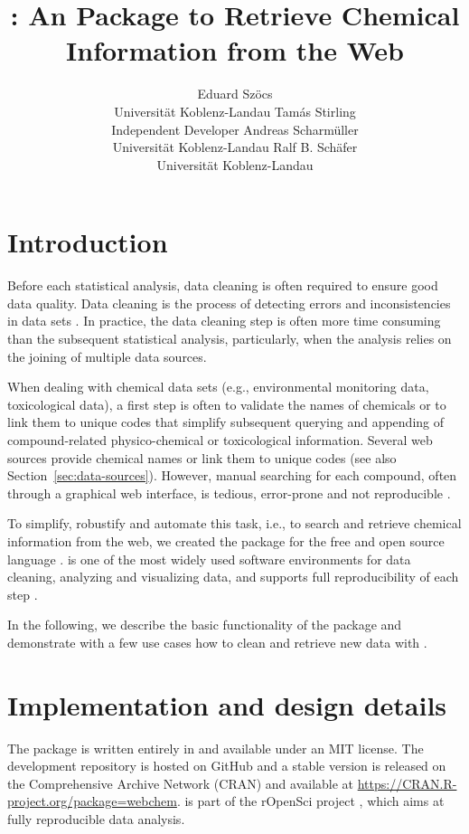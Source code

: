 \documentclass[article]{jss}
\author{Eduard Sz\"ocs\\Universit\"at Koblenz-Landau \And
	      Tam\'as Stirling\\Independent Developer \And
	      Andreas Scharm\"uller\\Universit\"at Koblenz-Landau \And
        Ralf B. Sch\"afer\\Universit\"at Koblenz-Landau}
\title{\pkg{webchem}: An \proglang{R} Package to Retrieve Chemical Information from the Web}
\begin{document}
\section[Introduction]{Introduction}
Before each statistical analysis, data cleaning is often required to
ensure good data quality.  Data cleaning is the process of detecting
errors and inconsistencies in data sets \citep{Chapman_2005}.  In
practice, the data cleaning step is often more time consuming than the
subsequent statistical analysis, particularly, when the analysis
relies on the joining of multiple data sources.

When dealing with chemical data sets (e.g., environmental monitoring
data, toxicological data), a first step is often to validate the names
of chemicals or to link them to unique codes that simplify subsequent
querying and appending of compound-related physico-chemical or
toxicological information.  Several web sources provide chemical names
or link them to unique codes (see also
Section~\ref{sec:data-sources}).  However, manual searching for each
compound, often through a graphical web interface, is tedious,
error-prone and not reproducible \citep{Peng_2009}.

To simplify, robustify and automate this task, i.e., to search and
retrieve chemical information from the web, we created the
 package \citep{cran} for the free and open source
 language \citep{r_2015, Wehrens_2011}.   is
one of the most widely used software environments for data cleaning,
analyzing and visualizing data, and supports full reproducibility of
each step \citep{Marwick_2016}.

In the following, we describe the basic functionality of the package
and demonstrate with a few use cases how to clean and retrieve new
data with .


\section[Implementation and design details]{Implementation and design details}
The  package is written entirely in  and
available under an MIT license.  The development repository is hosted
on GitHub \citep{github} and a stable version is released on the
Comprehensive  Archive Network (CRAN) and available at
\url{https://CRAN.R-project.org/package=webchem}.   is
part of the rOpenSci project \citep{boettiger2015building}, which aims
at fully reproducible data analysis.
\end{document}
